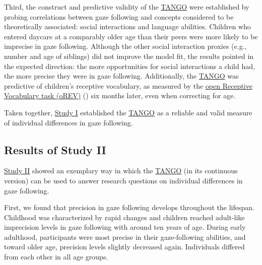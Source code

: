 \documentclass[
]{scrbook}
\begin{document}
Third, the construct and predictive validity of the \hyperref[acronyms_TANGO]{TANGO} were established by probing correlations between gaze following and concepts considered to be theoretically associated: social interactions and language abilities. Children who entered daycare at a comparably older age than their peers were more likely to be imprecise in gaze following. Although the other social interaction proxies (e.g., number and age of siblings) did not improve the model fit, the results pointed in the expected direction: the more opportunities for social interactions a child had, the more precise they were in gaze following. Additionally, the \hyperref[acronyms_TANGO]{TANGO} was predictive of children's receptive vocabulary, as measured by the \hyperref[acronyms_oREV]{open Receptive Vocabulary task (oREV)} () six months later, even when correcting for age.

Taken together, \hyperref[studyI]{Study I} established the \hyperref[acronyms_TANGO]{TANGO} as a reliable and valid measure of individual differences in gaze following.

\subsection{Results of Study II}\label{results-studyII}

\hyperref[studyII]{Study II} showed an exemplary way in which the \hyperref[acronyms_TANGO]{TANGO} (in its continuous version) can be used to answer research questions on individual differences in gaze following.

First, we found that precision in gaze following develops throughout the lifespan. Childhood was characterized by rapid changes and children reached adult-like imprecision levels in gaze following with around ten years of age. During early adulthood, participants were most precise in their gaze-following abilities, and toward older age, precision levels slightly decreased again. Individuals differed from each other in all age groups.
\end{document}
